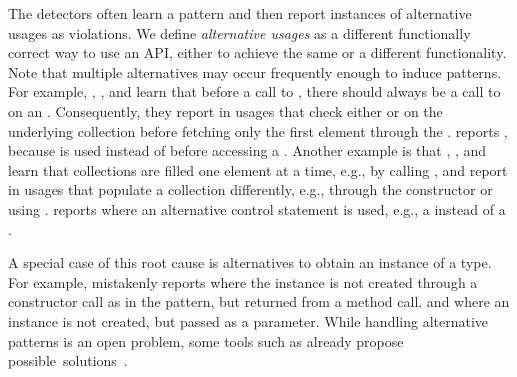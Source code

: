 \vspace{0.03in}
The detectors often learn a pattern and then report instances of alternative usages as violations.
We define \emph{alternative usages} as a different functionally correct way to use an API, either to achieve the same or a different functionality.
Note that multiple alternatives may occur frequently enough to induce patterns.
For example, \Jadet, \Tikanga, and \DMMC learn that before a call to , there should always be a call to  on an .
Consequently, they report  in usages that check either  or  on the underlying collection before fetching only the first element through the .
\DMMC reports , because  is used instead of  before accessing a .
%
Another example is that \Jadet, \Tikanga, and \DMMC learn that collections are filled one element at a time, e.g., by calling , and report  in usages that populate a collection differently, e.g., through the constructor or using .
%
%
\GROUMiner reports  where an alternative control statement is used, e.g., a  instead of a .

A special case of this root cause is alternatives to obtain an instance of a type.
For example, \GROUMiner mistakenly reports  where the instance is not created through a constructor call as in the pattern, but returned from a method call.
\Jadet and \DMMC{}  where an instance is not created, but passed as a parameter.
While handling alternative patterns is an open problem, some tools such as \Alattin already propose possible~solutions~\cite{TX09b}.


